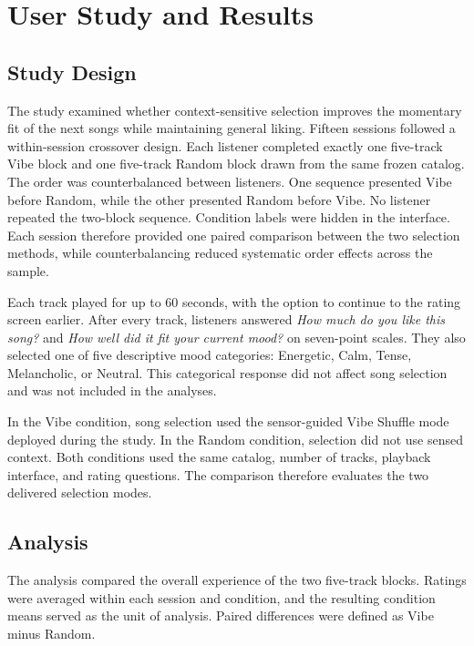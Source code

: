 \section{User Study and Results}
\label{sec:study}

\subsection{Study Design}

The study examined whether context-sensitive selection improves the momentary
fit of the next songs while maintaining general liking. Fifteen sessions
followed a within-session crossover design. Each listener completed exactly one
five-track Vibe block and one five-track Random block drawn from the same frozen
catalog. The order was counterbalanced between listeners. One sequence presented
Vibe before Random, while the other presented Random before Vibe. No listener
repeated the two-block sequence. Condition labels were hidden in the interface.
Each session therefore provided one paired comparison between the two selection
methods, while counterbalancing reduced systematic order effects across the
sample.

Each track played for up to 60 seconds, with the option to continue to the
rating screen earlier. After every track, listeners answered \emph{How much do
you like this song?} and \emph{How well did it fit your current mood?} on
seven-point scales. They also selected one of five descriptive mood categories:
Energetic, Calm, Tense, Melancholic, or Neutral. This categorical response did
not affect song selection and was not included in the analyses.

In the Vibe condition, song selection used the sensor-guided Vibe Shuffle mode
deployed during the study. In the Random condition, selection did not use sensed
context. Both conditions used the same catalog, number of tracks, playback
interface, and rating questions. The comparison therefore evaluates the two
delivered selection modes.

\subsection{Analysis}

The analysis compared the overall experience of the two five-track blocks.
Ratings were averaged within each session and condition, and the resulting
condition means served as the unit of analysis. Paired differences were defined
as Vibe minus Random.

